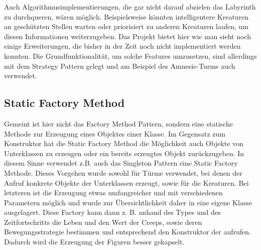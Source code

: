 Auch Algorithmusimplementierungen, die gar nicht darauf abzielen das Labyrinth zu durchqueren, wären möglich. Beispielsweise könnten intelligentere Kreaturen an geschützten Stellen warten oder priorisiert zu anderen Kreaturen laufen, um diesen Informationen weiterzugeben. Das Projekt bietet hier wie man sieht noch einige Erweiterungen, die bisher in der Zeit noch nicht implementiert werden konnten. Die Grundfunktionalität, um solche Features umzusetzen, sind allerdings mit dem Strategy Pattern gelegt und am Beispiel des Amnesie-Turms auch verwendet.


\subsection{Static Factory Method} %
\label{sub:static_factory_method}
Gemeint ist hier nicht das Factory Method Pattern, sondern eine statische Methode zur Erzeugung eines Objektes einer Klasse. Im Gegensatz zum Konstruktor hat die Static Factory Method die Möglichkeit auch Objekte von Unterklassen zu erzeugen oder ein bereits erzeugtes Objekt zurückzugeben. In diesem Sinne verwendet z.B. auch das Singleton Pattern eine Static Factory Methode. Dieses Vorgehen wurde sowohl für Türme verwendet, bei denen der Aufruf konkrete Objekte der Unterklassen erzeugt, sowie für die Kreaturen. Bei letzteren ist die Erzeugung etwas umfangreicher und mit verschiedenen Parametern möglich und wurde zur Übersichtlichkeit daher in eine eigene Klasse  ausgelagert. Diese Factory kann dann z. B. anhand des Types und des Zeitfortschritts die Leben und den Wert der Creeps, sowie deren Bewegungsstrategie bestimmen und entsprechend den Konstruktor der  aufrufen. Dadurch wird die Erzeugung der Figuren besser gekapselt.

